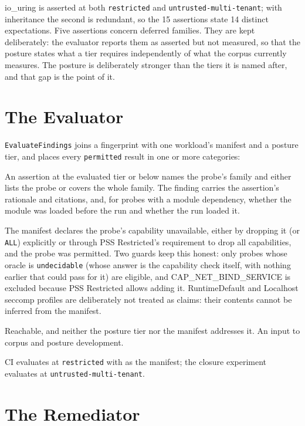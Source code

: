 io\_uring is asserted at both \texttt{restricted} and \texttt{untrusted-multi-tenant}; with inheritance the second is redundant, so the 15 assertions state 14 distinct expectations. Five assertions concern deferred families. They are kept deliberately: the evaluator reports them as asserted but not measured, so that the posture states what a tier requires independently of what the corpus currently measures. The posture is deliberately stronger than the tiers it is named after, and that gap is the point of it.

\section{The Evaluator}
\label{sec:evaluator}

\texttt{EvaluateFindings} joins a fingerprint with one workload's manifest and a posture tier, and places every \texttt{permitted} result in one or more categories:
\begin{description}[font=\normalfont\itshape,leftmargin=1em]
\item[Expectation violation] An assertion at the evaluated tier or below names the probe's family and either lists the probe or covers the whole family. The finding carries the assertion's rationale and citations, and, for probes with a module dependency, whether the module was loaded before the run and whether the run loaded it.
\item[Claim violation] The manifest declares the probe's capability unavailable, either by dropping it (or \texttt{ALL}) explicitly or through PSS Restricted's requirement to drop all capabilities, and the probe was permitted. Two guards keep this honest: only probes whose oracle is \texttt{undecidable} (whose answer is the capability check itself, with nothing earlier that could pass for it) are eligible, and CAP\_NET\_BIND\_SERVICE is excluded because PSS Restricted allows adding it. RuntimeDefault and Localhost seccomp profiles are deliberately not treated as claims: their contents cannot be inferred from the manifest.
\item[Undeclared exposure] Reachable, and neither the posture tier nor the manifest addresses it. An input to corpus and posture development.
\end{description}
CI evaluates at \texttt{restricted} with  as the manifest; the closure experiment evaluates at \texttt{untrusted-multi-tenant}.

\section{The Remediator}
\label{sec:remediator}


